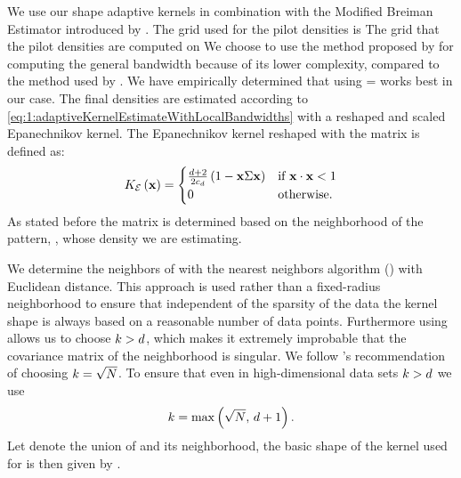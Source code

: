 
	We use our shape adaptive kernels in combination with the Modified Breiman Estimator introduced by \textcite{wilkinson1995dataplot}. The grid used for the pilot densities is 
	The grid that the pilot densities are computed on  
	We choose to use the method proposed by \textcite{ferdosi2011comparison} for computing the general bandwidth because of its lower complexity, compared to the method used by \textcite{wilkinson1995dataplot}. 
	We have empirically determined  that using \varMBESensitivityParam =  works best in our case. 
	The final densities are estimated according to \cref{eq:1:adaptiveKernelEstimateWithLocalBandwidths} with a reshaped and scaled Epanechnikov kernel. The Epanechnikov kernel reshaped with the matrix \varCovarianceMatrix is defined as:
	\begin{equation}\label{eq:1:epanechnikovKernelWithCovarianceMatrix}
		\varKernel[\varEpan]{\varPattern} = 
		\begin{cases}
			\frac{\varDim + 2}{2\varUnitSphere{\varDim}} \left( 1 - \varPattern \varCovarianceMatrix \varPattern \right) & \text{if } \varPattern \cdot \varPattern < 1\\
			0 & \text{otherwise.}
		\end{cases}
	\end{equation}
	As stated before the matrix \varCovarianceMatrix is determined based on the neighborhood of the pattern, \varPattern, whose density we are estimating. 

	We determine the neighbors of \varPattern with the \KNNK nearest neighbors algorithm (\KNN) with Euclidean distance. This approach is used rather than a fixed-radius neighborhood to ensure that independent of the sparsity of the data the kernel shape is always based on a reasonable number of data points. Furthermore using \KNN allows us to choose $k > d$, which makes it extremely improbable that the covariance matrix of the neighborhood is singular. We follow \citeauthor{silverman1986density}'s \cite{silverman1986density} recommendation of choosing $k = \sqrt{N}$. To ensure that even in high-dimensional data sets $k > d$ we use
	\begin{equation*}
	k = \max\left(\sqrt{N},\, d + 1\right).	
	\end{equation*}
	Let \varNeighborhood{\varPattern} denote the union of \varPattern and its neighborhood, the basic shape of the kernel used for \varPattern is then given by \varCovarianceFunction{\varNeighborhood{\varPattern}}.

